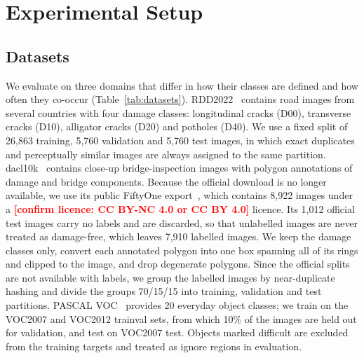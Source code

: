 \documentclass[conference]{IEEEtran}
\newcommand{\todo}[1]{\textcolor{red}{\textbf{[#1]}}}
\begin{document}
\section{Experimental Setup}
\label{sec:setup}

\subsection{Datasets}
\label{sec:setup_data}

We evaluate on three domains that differ in how their classes are defined and how often they co-occur (Table~\ref{tab:datasets}). RDD2022~\cite{arya2024rdd} contains road images from several countries with four damage classes: longitudinal cracks (D00), transverse cracks (D10), alligator cracks (D20) and potholes (D40). We use a fixed split of 26,863 training, 5,760 validation and 5,760 test images, in which exact duplicates and perceptually similar images are always assigned to the same partition. dacl10k~\cite{flotzinger2024dacl10k} contains close-up bridge-inspection images with polygon annotations of damage and bridge components. Because the official download is no longer available, we use its public FiftyOne export~\cite{voxel51dacl10k}, which contains 8,922 images under a \todo{confirm licence: CC BY-NC 4.0 or CC BY 4.0} licence. Its 1,012 official test images carry no labels and are discarded, so that unlabelled images are never treated as damage-free, which leaves 7,910 labelled images. We keep the damage classes only, convert each annotated polygon into one box spanning all of its rings and clipped to the image, and drop degenerate polygons. Since the official splits are not available with labels, we group the labelled images by near-duplicate hashing and divide the groups 70/15/15 into training, validation and test partitions. PASCAL VOC~\cite{everingham2010voc} provides 20 everyday object classes; we train on the VOC2007 and VOC2012 trainval sets, from which 10\% of the images are held out for validation, and test on VOC2007 test. Objects marked difficult are excluded from the training targets and treated as ignore regions in evaluation.
\end{document}
